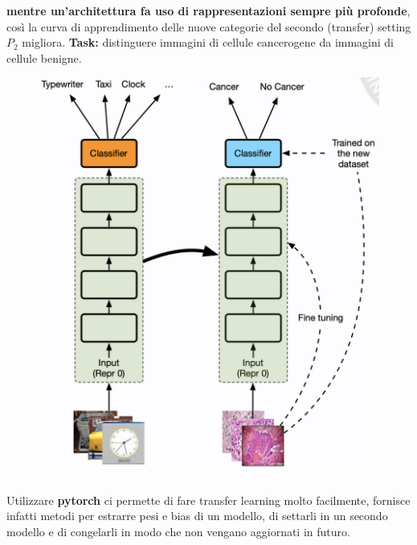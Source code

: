 \textbf{mentre un'architettura fa uso di rappresentazioni sempre più profonde}, così la curva di 
apprendimento delle nuove categorie del secondo (transfer) setting $P_2$ migliora.
\newline
\newline
\textbf{Task:} distinguere immagini di cellule cancerogene da immagini di cellule benigne.
\begin{figure}[!h]
  \includegraphics[scale=.5]{images/representation_learning/trans_learning.png}
  \centering
\end{figure}
\newpage
Utilizzare \textbf{pytorch} ci permette di fare transfer learning molto facilmente, 
fornisce infatti metodi per estrarre pesi e bias di un modello, di settarli in un secondo modello e di 
congelarli in modo che non vengano aggiornati in futuro.

